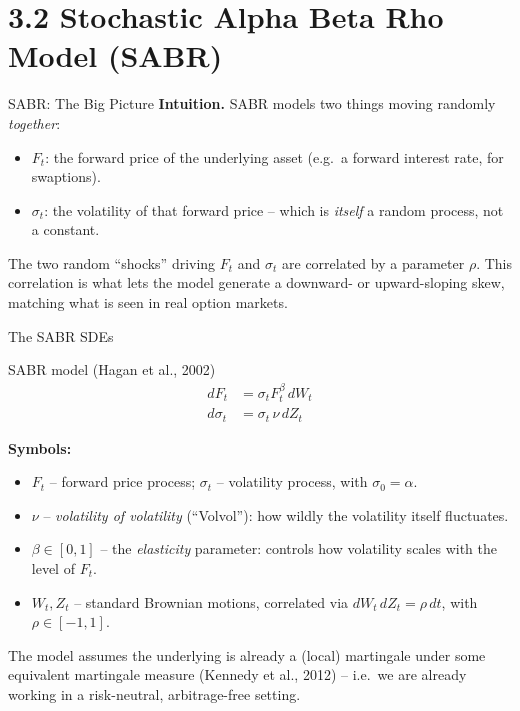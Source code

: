 \documentclass[aspectratio=169,10pt]{beamer}
\begin{document}
\section{3.2 Stochastic Alpha Beta Rho Model (SABR)}

\begin{frame}{SABR: The Big Picture}
  \textbf{Intuition.} SABR models two things moving randomly \emph{together}:
  \begin{itemize}
    \item $F_t$: the forward price of the underlying asset (e.g.\ a forward
      interest rate, for swaptions).
    \item $\sigma_t$: the volatility of that forward price -- which is
      \emph{itself} a random process, not a constant.
  \end{itemize}
  The two random ``shocks'' driving $F_t$ and $\sigma_t$ are correlated by a
  parameter $\rho$. This correlation is what lets the model generate a
  downward- or upward-sloping skew, matching what is seen in real option
  markets.
\end{frame}

\begin{frame}{The SABR SDEs}
  \begin{block}{SABR model (Hagan et al., 2002)}
  \begin{align}
    dF_t &= \sigma_t F_t^\beta \, dW_t \label{eq:sabr1}\\
    d\sigma_t &= \sigma_t \, \nu \, dZ_t \label{eq:sabr2}
  \end{align}
  \end{block}
  \textbf{Symbols:}
  \begin{itemize}
    \item $F_t$ -- forward price process; $\sigma_t$ -- volatility process, with $\sigma_0=\alpha$.
    \item $\nu$ -- \emph{volatility of volatility} (``Volvol''): how wildly the volatility itself fluctuates.
    \item $\beta \in [0,1]$ -- the \emph{elasticity} parameter: controls how volatility scales with the level of $F_t$.
    \item $W_t, Z_t$ -- standard Brownian motions, correlated via $dW_t\, dZ_t = \rho\, dt$, with $\rho \in [-1,1]$.
  \end{itemize}
  The model assumes the underlying is already a (local) martingale under some
  equivalent martingale measure (Kennedy et al., 2012) -- i.e.\ we are already
  working in a risk-neutral, arbitrage-free setting.
\end{frame}
\end{document}
